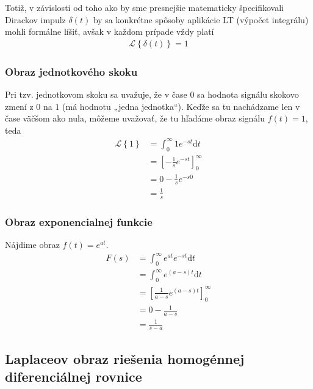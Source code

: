 \documentclass[a4paper, 10pt, ]{article}
\begin{document}
Totiž, v závislosti od toho ako by sme presnejšie matematicky špecifikovali Dirackov impulz $\delta(t)$ by sa konkrétne spôsoby aplikácie LT (výpočet integrálu) mohli formálne líšiť, avšak v každom prípade vždy platí
\begin{align}
    \mathcal L \left\{ \delta(t) \right\} = 1
\end{align}


\subsubsection{Obraz jednotkového skoku}
Pri tzv. jednotkovom skoku sa uvažuje, že v čase $0$ sa hodnota signálu skokovo zmení z $0$ na $1$ (má hodnotu „jedna jednotka“). Keďže sa tu nachádzame len v čase väčšom ako nula, môžeme uvažovať, že tu hľadáme obraz signálu $f(t) = 1$, teda
\begin{equation}
    \begin{aligned}
        \mathcal L \left\{ 1 \right\} &= \int_0^\infty 1 e^{-st}\text{d}t \\
        &= \left[ - \frac{1}{s} e^{-st} \right]_0^\infty \\
        &= 0 - \frac{1}{s} e^{-s0} \\
        &= \frac{1}{s}
    \end{aligned}
\end{equation}




\subsubsection{Obraz exponencialnej funkcie}
\label{vyhlcast}

Nájdime obraz $f(t) = e^{at}$.
\begin{equation}
    \begin{aligned}
        F(s) &= \int_0^\infty e^{at} e^{-st}\text{d}t \\
        &= \int_0^\infty e^{(a-s)t}\text{d}t \\
        &= \left[ \frac{1}{a-s} e^{(a-s)t} \right]_0^\infty \\
        &= 0 - \frac{1}{a-s} \\
        &= \frac{1}{s - a}
    \end{aligned}
\end{equation}





\subsection{Laplaceov obraz riešenia homogénnej diferenciálnej rovnice}
\end{document}
